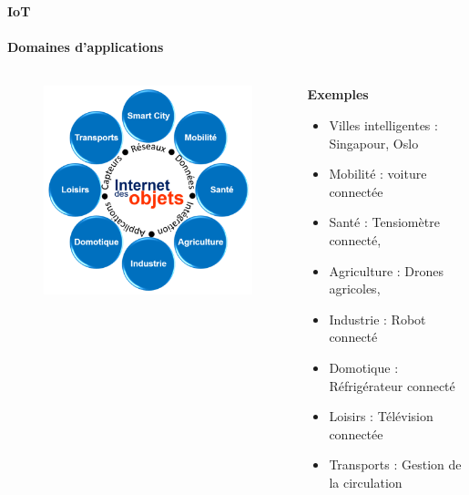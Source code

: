 \documentclass[aspectratio=169,professionalfonts, 12pt]{beamer}
\begin{document}
\begin{frame}{\textbf{IoT}}
\framesubtitle{\textbf{Domaines d'applications}}
\begin{columns}
     \begin{column}{0.4\textwidth}
	    \begin{figure}[t]
	      \centering
	      \includegraphics[height=0.7\textheight]{images/Application_IoT}
	    \end{figure}    			
      \end{column}
	  \begin{column}{0.6\textwidth}
	      		{
	      \begin{block}{\textbf{Exemples}}
	      	\begin{itemize}
	   	\item<3-> Villes intelligentes : Singapour, Oslo%
  			  			
	    \item<4-> Mobilité : voiture connectée
	      			 				
	    \item<5-> Santé : Tensiomètre connecté, %
	      			
	      \item<6-> Agriculture : Drones agricoles,%
	
	      	\item<7-> Industrie : Robot connecté
	      	
	      	\item<8-> Domotique :  Réfrigérateur connecté %
	      		\item<9-> Loisirs : Télévision connectée 
	      		\item<10-> Transports : Gestion de la circulation
	      			\end{itemize}
	      		\end{block}
      		  }
	      	\end{column}
      	\end{columns}	
		 
\end{frame}
\end{document}
